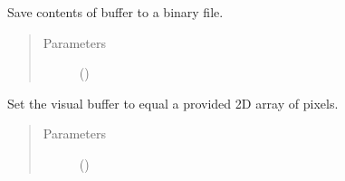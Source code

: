 \documentclass[letterpaper,10pt,english]{sphinxmanual}
\begin{document}
\begin{fulllineitems}
\begin{fulllineitems}
\begin{quote}
\begin{description}
\end{description}\end{quote}

\end{fulllineitems}


\begin{fulllineitems}
\label{\detokenize{dpav:dpav.vbuffer.VBuffer.save_buffer_to_file}}
\sphinxAtStartPar
Save contents of buffer to a binary file.
\begin{quote}\begin{description}
\item[{Parameters}] \leavevmode
\sphinxAtStartPar
{} () \textendash{} 

\end{description}\end{quote}

\end{fulllineitems}


\begin{fulllineitems}
\label{\detokenize{dpav:dpav.vbuffer.VBuffer.set_buffer}}
\sphinxAtStartPar
Set the visual buffer to equal a provided 2D array of pixels.
\begin{quote}\begin{description}
\item[{Parameters}] \leavevmode
\sphinxAtStartPar
{} () \textendash{} 

\end{description}\end{quote}

\end{fulllineitems}


\end{fulllineitems}
\end{document}
